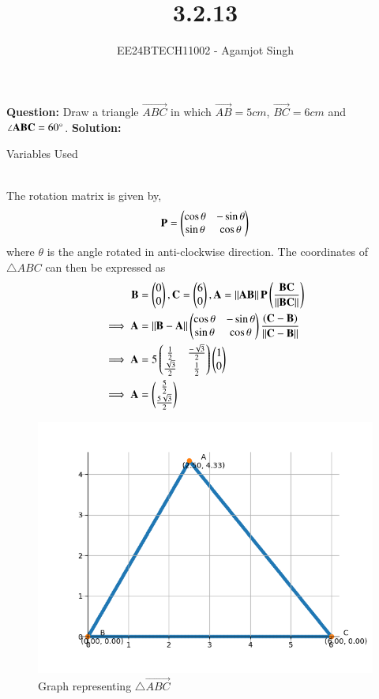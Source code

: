 \documentclass[journal]{IEEEtran}
\begin{document}

\vspace{3cm}

\title{3.2.13}
\author{EE24BTECH11002 - Agamjot Singh}
{\let\newpage\relax\maketitle}

\renewcommand{\thefigure}{\theenumi}
\renewcommand{\thetable}{\theenumi}
\setlength{\intextsep}{10pt} %

\textbf{Question:}
\newline
Draw a triangle $\vec{ABC}$ in which $\vec{AB} = 5 cm$, $\vec{BC} = 6 cm$ and $\angle\mathbf{ABC} = 60\degree$.
\newline
\textbf{Solution:}
\newline
\begin{table}[h!]    
	\centering
	
	\caption{Variables Used}
	\label{tab1-1.5-29}
\end{table}\\
The rotation matrix  is given by,
\begin{align}
	\mathbf{P} = \begin{pmatrix}\cos{\theta} & -\sin{\theta}\\\sin{\theta} & \cos{\theta}\end{pmatrix}
\end{align}
where $\theta$ is the angle rotated in anti-clockwise direction.
\newline
The coordinates of $\triangle ABC$ can then be expressed as
\begin{align}
	\mathbf{B} &= \begin{pmatrix}0\\0\end{pmatrix}, \mathbf{C} = \begin{pmatrix}6\\0\end{pmatrix}, \mathbf{A} = \left\lVert\mathbf{AB}\right\rVert\mathbf{P}\left(\frac{\mathbf{BC}}{\left\lVert\mathbf{BC}\right\rVert}\right)\\
	\implies \mathbf{A} &= \left\lVert\mathbf{B} - \mathbf{A}\right\rVert\begin{pmatrix}\cos{\theta} & -\sin{\theta}\\\sin{\theta} & \cos{\theta}\end{pmatrix}\frac{\left(\mathbf{C} - \mathbf{B}\right)}{\left\lVert\mathbf{C} - \mathbf{B}\right\rVert}\\
	\implies \mathbf{A} &= 5\begin{pmatrix}\frac{1}{2} & \frac{-\sqrt{3}}{2}\\\frac{\sqrt{3}}{2} & \frac{1}{2}\end{pmatrix}\begin{pmatrix}1\\0\end{pmatrix}\\
	\implies \mathbf{A} &= \begin{pmatrix}\frac{5}{2}\\\frac{5\sqrt{3}}{2}\end{pmatrix}
\end{align}

\begin{figure}[h!]
   \centering
   \includegraphics[width=0.7\linewidth]{figs/graph.png}
   \caption{Graph representing $\triangle \vec{ABC}$}
\end{figure}
\end{document}
